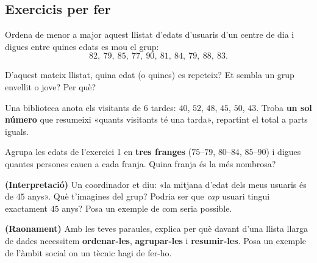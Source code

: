 \subsection{Exercicis per fer}

\begin{exercicis}
\begin{exlist}
  \item Ordena de menor a major aquest llistat d'edats d'usuaris d'un centre de dia i
        digues entre quines edats es mou el grup:
        \[
        82,\ 79,\ 85,\ 77,\ 90,\ 81,\ 84,\ 79,\ 88,\ 83.
        \]
  \item D'aquest mateix llistat, quina edat (o quines) es repeteix? Et sembla un grup
        envellit o jove? Per què?
  \item Una biblioteca anota els visitants de $6$ tardes: $40$, $52$, $48$, $45$,
        $50$, $43$. Troba \textbf{un sol número} que resumeixi «quants visitants té
        una tarda», repartint el total a parts iguals.
  \item Agrupa les edats de l'exercici 1 en \textbf{tres franges} ($75$–$79$,
        $80$–$84$, $85$–$90$) i digues quantes persones cauen a cada franja. Quina
        franja és la més nombrosa?
  \item \textbf{(Interpretació)} Un coordinador et diu: «la mitjana d'edat dels meus
        usuaris és de $45$ anys». Què t'imagines del grup? Podria ser que \emph{cap}
        usuari tingui exactament $45$ anys? Posa un exemple de com seria possible.
  \item \textbf{(Raonament)} Amb les teves paraules, explica per què davant d'una
        llista llarga de dades necessitem \textbf{ordenar-les}, \textbf{agrupar-les} i
        \textbf{resumir-les}. Posa un exemple de l'àmbit social on un tècnic hagi de
        fer-ho.
\end{exlist}
\end{exercicis}

